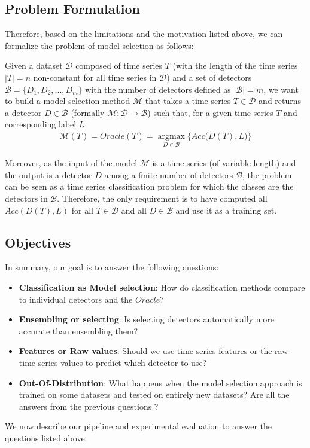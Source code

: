 \vspace{-0.1cm}
\subsection{Problem Formulation}

Therefore, based on the limitations and the motivation listed above, we can formalize the problem of model selection as follows:

\vspace{-0.1cm}
\begin{problem}
    \label{prob:probdef}
    Given a dataset $\mathcal{D}$ composed of time series $T$ (with the length of the time series $|T|=n$ non-constant for all time series in $\mathcal{D}$) and a set of detectors $\mathcal{B} = \{D_1, D_2, ..., D_m\}$ with the number of detectors defined as $|\mathcal{B}|=m$, we want to build a model selection method $\mathcal{M}$ that takes a time series $T\in \mathcal{D}$ and returns a detector $D\in \mathcal{B}$ (formally $\mathcal{M}: \mathcal{D} \rightarrow \mathcal{B}$) such that, for a given time series $T$ and corresponding label $L$:
    \begin{align*}
        \mathcal{M}(T) = Oracle(T)= \operatorname*{argmax}_{D \in \mathcal{B}} \bigg\{Acc\big(D(T),L\big)\bigg\}
    \end{align*}
\end{problem}

Moreover, as the input of the model $\mathcal{M}$ is a time series (of variable length) and the output is a detector $D$ among a finite number of detectors $\mathcal{B}$, the problem can be seen as a time series classification problem for which the classes are the detectors in $\mathcal{B}$. Therefore, the only requirement is to have computed all $Acc(D(T),L)$ for all $T\in \mathcal{D}$ and all $D\in \mathcal{B}$ and use it as a training set.

\subsection{Objectives}
\label{sec:objective}

In summary, our goal is to answer the following questions:
\begin{itemize}[noitemsep, topsep=0pt, parsep=0pt, partopsep=0pt, leftmargin=0.3cm]
	\item \textbf{Classification as Model selection}: How do classification methods compare to individual detectors and the $Oracle$?
	\item \textbf{Ensembling or selecting}: Is selecting detectors automatically more accurate than ensembling them?
	\item \textbf{Features or Raw values}: Should we use time series features or the raw time series values to predict which detector to use?
	\item \textbf{Out-Of-Distribution}: What happens when the model selection approach is trained on some datasets and tested on entirely new datasets? Are all the answers from the previous questions ? 
\end{itemize}

\noindent We now describe our pipeline and experimental evaluation to answer the questions listed above. 
